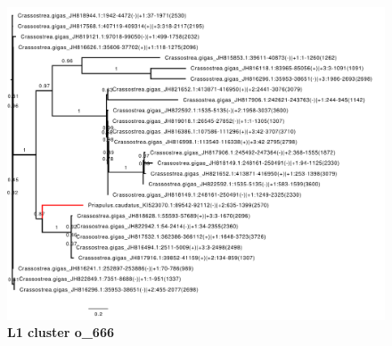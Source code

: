 \documentclass[12pt,a4paper,times]{article}
\begin{document}
\begin{figure}[H]
	\centering
	\includegraphics[scale=0.6]{suppFigures/clusters/c_666.pdf}
	\caption{\footnotesize \textbf{L1 cluster o\_666} \label{L1fam666}}
\end{figure}

\clearpage
\end{document}

